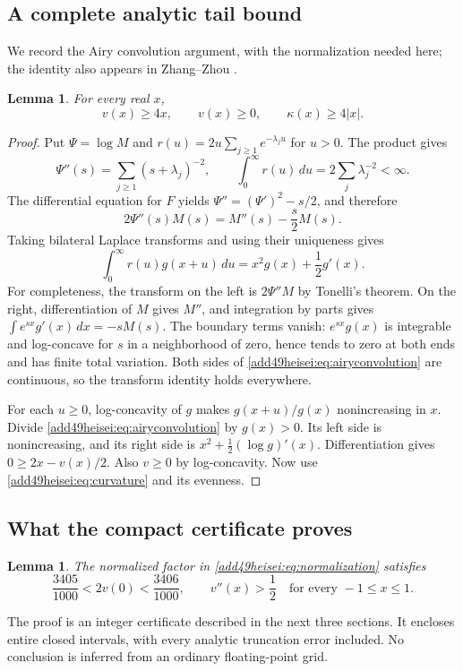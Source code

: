 \documentclass[11pt,a4paper]{article}
\numberwithin{equation}{section}
\newtheorem{lemma}[theorem]{Lemma}
\theoremstyle{definition}
\theoremstyle{remark}
\begin{document}
\subsection{A complete analytic tail bound}
We record the Airy convolution argument, with the normalization needed
here; the identity also appears in Zhang--Zhou \cite[Lemma 7]{add49heisei:zz}.
\begin{lemma}\label{add49heisei:lem:tail}
For every real $x$,
\[
 v(x)\ge4x,\qquad v(x)\ge0,\qquad \kappa(x)\ge4|x|.
\]
\end{lemma}
\begin{proof}
Put $\Psi=\log M$ and
$r(u)=2u\sum_{j\ge1}e^{-\lambda_j u}$ for $u>0$.
The product gives
\[
 \Psi''(s)=\sum_{j\ge1}(s+\lambda_j)^{-2},\qquad
 \int_0^\infty r(u)\,du=2\sum_j\lambda_j^{-2}<\infty.
\]
The differential equation for $F$ yields
$\Psi''=(\Psi')^2-s/2$, and therefore
\[
 2\Psi''(s)M(s)=M''(s)-\frac{s}{2}M(s).
\]
Taking bilateral Laplace transforms and using their uniqueness gives
\begin{equation}\label{add49heisei:eq:airyconvolution}
 \int_0^\infty r(u)g(x+u)\,du
 =x^2g(x)+\frac12g'(x).
\end{equation}
For completeness, the transform on the left is $2\Psi''M$ by Tonelli's
theorem. On the right, differentiation of $M$ gives $M''$, and integration
by parts gives $\int e^{sx}g'(x)\,dx=-sM(s)$.
The boundary terms vanish: $e^{sx}g(x)$ is integrable and log-concave for
$s$ in a neighborhood of zero, hence tends to zero at both ends and has
finite total variation. Both sides of \eqref{add49heisei:eq:airyconvolution} are
continuous, so the transform identity holds everywhere.

For each $u\ge0$, log-concavity of $g$ makes $g(x+u)/g(x)$ nonincreasing
in $x$. Divide \eqref{add49heisei:eq:airyconvolution} by $g(x)>0$. Its left side is
nonincreasing, and its right side is $x^2+\tfrac12(\log g)'(x)$.
Differentiation gives $0\ge2x-v(x)/2$. Also $v\ge0$ by log-concavity.
Now use \eqref{add49heisei:eq:curvature} and its evenness.
\end{proof}

\subsection{What the compact certificate proves}
\begin{lemma}\label{add49heisei:lem:compact}
The normalized factor in \eqref{add49heisei:eq:normalization} satisfies
\[
 \frac{3405}{1000}<2v(0)<\frac{3406}{1000},\qquad
 v''(x)>\frac12\quad\text{for every }-1\le x\le1.
\]
\end{lemma}
The proof is an integer certificate described in the next three sections.
It encloses entire closed intervals, with every analytic truncation error
included. No conclusion is inferred from an ordinary floating-point grid.
\end{document}
